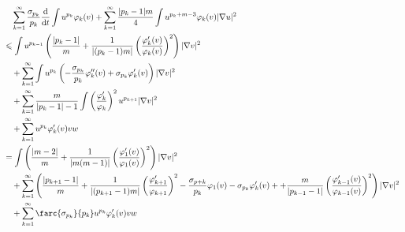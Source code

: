 \documentclass[12pt,]{article}
\begin{document}
\begin{equation}
  \begin{aligned}
    &\quad\sum_{k=1}^{\infty}\frac{\sigma_{p_k}}{p_k}\frac{\mathrm{d}}{\mathrm{d}t}\int u^{p_k}\varphi_k(v) + \sum_{k=1}^{\infty}\frac{|p_k-1|m}{4}\int u^{p_k+m-3}\varphi_k(v)|\nabla u|^2\\
    &\leqslant \int u^{p_{k-1}}\left(\frac{|p_k-1|}{m}+\frac{1}{|(p_k-1)m|}\left(\frac{\varphi_k'(v)}{\varphi_k(v)}\right)^{2}\right)|\nabla v|^{2}\\
    &\quad + \sum_{k=1}^{\infty}\int u^{p_{k}}\left(-\frac{\sigma_{p_k}}{p_k}\varphi_k''(v)+\sigma_{p_k}\varphi_{k}'(v)\right)|\nabla v|^2\\
    &\quad + \sum_{k=1}^{\infty}\frac{m}{|p_k-1|-1}\int\left(\frac{\varphi_k'}{\varphi_{k}}\right)^2u^{p_{k+1}}|\nabla v|^2\\
    &\quad + \sum_{k=1}^{\infty}u^{p_k}\varphi_k'(v)vw\\
    & = \int \left(\frac{|m-2|}{m}+\frac{1}{|m(m-1)|}\left(\frac{\varphi_1'(v)}{\varphi_1(v)}\right)^{2}\right)|\nabla v|^{2}\\
    &\quad + \sum_{k=1}^\infty\left(\frac{|p_{k+1}-1|}{m}+\frac{1}{|(p_{k+1}-1)m|}\left(\frac{\varphi_{k+1}'}{\varphi_{k+1}}\right)^{2}-\frac{\sigma_{{p+k}}}{p_k}\varphi_1(v) - \sigma_{p_k}\varphi_k'(v)+ + \frac{m}{|p_{k-1}-1|}\left(\frac{\varphi_{k-1}'(v)}{\varphi_{k-1}(v)}\right)^{2}\right)|\nabla v|^{2}\\
    & \quad + \sum_{k=1}^{\infty}\farc{\sigma_{p_k}}{p_k}u^{p_k}\varphi_k'(v)vw
  \end{aligned}
\end{equation}




% 
\end{document}
